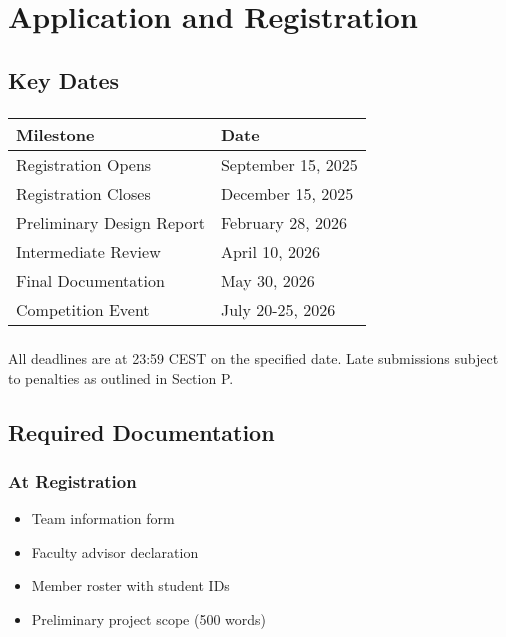 
\renewcommand{\thesection}{R}
\section{Application and Registration}

\subsection{Key Dates}

\subsubsection{}\newline
\begin{tabular}{ll}
\toprule
Milestone & Date \\
\midrule
Registration Opens & September 15, 2025 \\
Registration Closes & December 15, 2025 \\
Preliminary Design Report & February 28, 2026 \\
Intermediate Review & April 10, 2026 \\
Final Documentation & May 30, 2026 \\
Competition Event & July 20-25, 2026 \\
\bottomrule
\end{tabular}

\subsubsection{}
All deadlines are at 23:59 CEST on the specified date. Late submissions subject to penalties as outlined in Section P.

\subsection{Required Documentation}

\subsubsection{At Registration}
\begin{itemize}[noitemsep]
    \item Team information form
    \item Faculty advisor declaration
    \item Member roster with student IDs
    \item Preliminary project scope (500 words)
\end{itemize}


